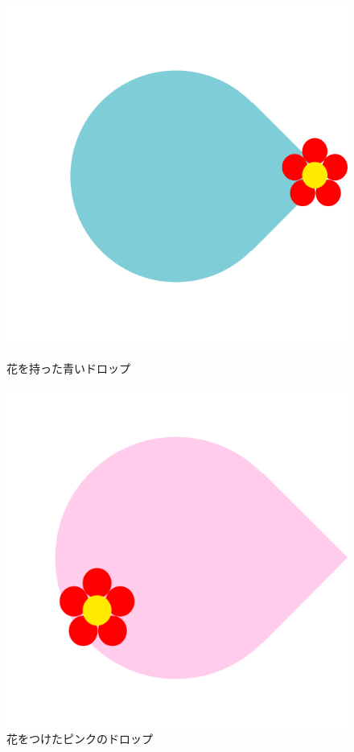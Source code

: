 \documentclass[a4]{jsarticle}
\begin{document}
\begin{figure}[htbp]
	\begin{minipage}[t]{0.5\hsize}
		\begin{center}
			\includegraphics[scale=0.2]{../imgs2/drop_blue_flower.png}
			\caption{花を持った青いドロップ}
			\label{fig:blue_drop_flower}
		\end{center}
	\end{minipage}
	\begin{minipage}[t]{0.5\hsize}
		\begin{center}
			\includegraphics[scale=0.2]{../imgs2/drop_pink_flower.png}
			\caption{花をつけたピンクのドロップ}
			\label{fig:pink_drop_flower}
		\end{center}
	\end{minipage}
\end{figure}
\end{document}
